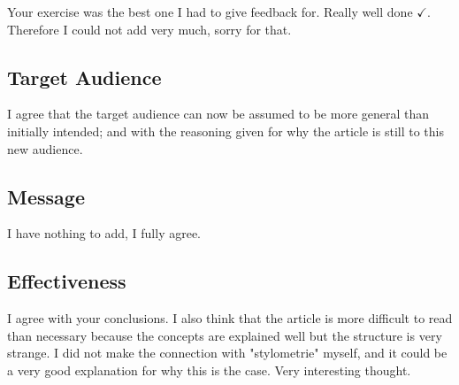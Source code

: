 \documentclass[12pt, a4paper]{article}
\begin{document}
Your exercise was the best one I had to give feedback for. Really well done $\checkmark$. Therefore I could not add very much, sorry for that.

\subsection{Target Audience}
I agree that the target audience can now be assumed to be more general than initially intended; and with the reasoning given for why the article is still to this new audience.

\subsection{Message}
I have nothing to add, I fully agree.

\subsection{Effectiveness}
I agree with your conclusions. I also think that the article is more difficult to read than necessary because the concepts are explained well but the structure is very strange. I did not make the connection with "stylometrie" myself, and it could be a very good explanation for why this is the case. Very interesting thought.
\end{document}
